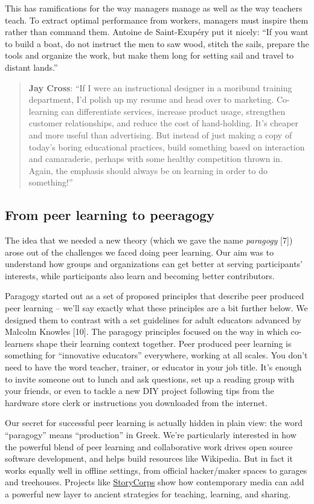 This has ramifications for the way managers manage as well as the way
teachers teach. To extract optimal performance from workers, managers
must inspire them rather than command them. Antoine de Saint-Exupéry put
it nicely: ``If you want to build a boat, do not instruct the men to saw
wood, stitch the sails, prepare the tools and organize the work, but
make them long for setting sail and travel to distant lands.''

\begin{quote}
\textbf{Jay Cross}: ``If I were an instructional designer in a moribund
training department, I'd polish up my resume and head over to marketing.
Co-learning can differentiate services, increase product usage,
strengthen customer relationships, and reduce the cost of hand-holding.
It's cheaper and more useful than advertising. But instead of just
making a copy of today's boring educational practices, build something
based on interaction and camaraderie, perhaps with some healthy
competition thrown in. Again, the emphasis should always be on learning
in order to do something!''
\end{quote}
\subsection{From peer learning to peeragogy}

The idea that we needed a new theory (which we gave the name
\emph{paragogy} {[}7{]}) arose out of the challenges we faced doing peer
learning. Our aim was to understand how groups and organizations can get
better at serving participants' interests, while participants also learn
and becoming better contributors.

Paragogy started out as a set of proposed principles that describe peer
produced peer learning -- we'll say exactly what these principles are a
bit further below. We designed them to contrast with a set guidelines
for adult educators advanced by Malcolm Knowles {[}10{]}. The paragogy
principles focused on the way in which co-learners shape their learning
context together. Peer produced peer learning is something for
``innovative educators'' everywhere, working at all scales. You don't
need to have the word teacher, trainer, or educator in your job title.
It's enough to invite someone out to lunch and ask questions, set up a
reading group with your friends, or even to tackle a new DIY project
following tips from the hardware store clerk or instructions you
downloaded from the internet.

Our secret for successful peer learning is actually hidden in plain
view: the word ``paragogy'' means ``production'' in Greek. We're
particularly interested in how the powerful blend of peer learning and
collaborative work drives open source software development, and helps
build resources like Wikipedia. But in fact it works equally well in
offline settings, from official hacker/maker spaces to garages and
treehouses. Projects like
\href{http://storycorps.org/about/}{StoryCorps} show how contemporary
media can add a powerful new layer to ancient strategies for teaching,
learning, and sharing.

